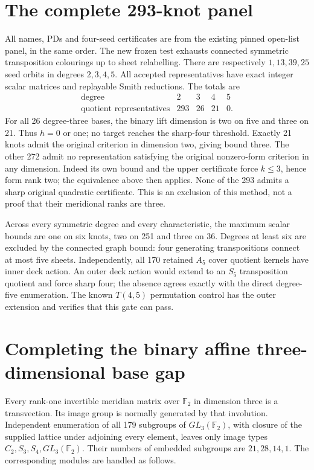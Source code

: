 \documentclass[11pt]{article}
\newcommand{\F}{\mathbb F}
\begin{document}
\section{The complete 293-knot panel}

All names, PDs and four-seed certificates are from the existing
pinned open-list panel, in the same order. The new frozen test
exhausts connected symmetric transposition colourings up to
sheet relabelling. There are respectively $1,13,39,25$ seed
orbits in degrees $2,3,4,5$. All accepted representatives have
exact integer scalar matrices and replayable Smith reductions.
The totals are
\[
\begin{array}{c|rrrr}
\text{degree}&2&3&4&5\\\hline
\text{quotient representatives}&293&26&21&0.
\end{array}
\]
For all 26 degree-three bases, the binary lift dimension is two
on five and three on 21. Thus $h=0$ or one; no target reaches
the sharp-four threshold. Exactly 21 knots admit the original
criterion in dimension two, giving bound three. The other 272
admit no representation satisfying the original nonzero-form
criterion in any dimension. Indeed its own bound and the
upper certificate force $k\le3$, hence form rank two; the
equivalence above then applies. None of the 293 admits a sharp
original quadratic certificate. This is an exclusion of this
method, not a proof that their meridional ranks are three.

Across every symmetric degree and every characteristic, the
maximum scalar bounds are one on six knots, two on 251 and
three on 36. Degrees at least six are excluded by the connected
graph bound: four generating transpositions connect at most
five sheets. Independently, all 170 retained $A_5$ cover
quotient kernels have inner deck action. An outer deck action
would extend to an $S_5$ transposition quotient and force sharp
four; the absence agrees exactly with the direct degree-five
enumeration. The known $T(4,5)$ permutation control has the
outer extension and verifies that this gate can pass.

\section{Completing the binary affine three-dimensional base gap}

Every rank-one invertible meridian matrix over $\F_2$ in
dimension three is a transvection. Its image group is normally
generated by that involution. Independent enumeration of all
179 subgroups of $GL_3(\F_2)$, with closure of the supplied
lattice under adjoining every element, leaves only image
types $C_2,S_3,S_4,GL_3(\F_2)$. Their numbers of embedded
subgroups are $21,28,14,1$. The corresponding modules are
handled as follows.
\end{document}
